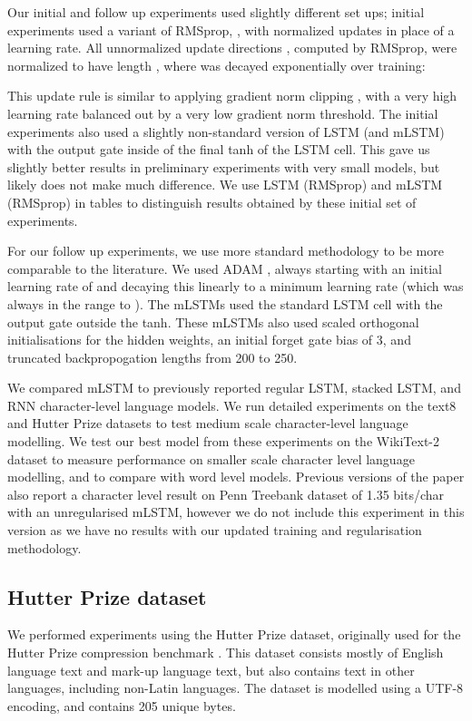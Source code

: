\documentclass{article}
\begin{document}
Our initial and follow up experiments used slightly different set ups; initial experiments used a variant of RMSprop, \citep{tieleman2012}, with normalized updates in place of a learning rate. All unnormalized update directions , computed by RMSprop, were normalized to have length , where  was decayed exponentially over training:


This update rule is similar to applying gradient norm clipping \citep{pascanu2013}, with a very high learning rate balanced out by a very low gradient norm threshold. The initial experiments also used a slightly non-standard version of LSTM (and mLSTM) with the output gate inside of the final tanh of the LSTM cell. This gave us slightly better results in preliminary experiments with very small models, but likely does not make much difference. We use LSTM (RMSprop) and mLSTM (RMSprop) in tables to distinguish results obtained by these initial set of experiments.

For our follow up experiments, we use more standard methodology to be more comparable to the literature. We used ADAM \citep{kingma2014}, always starting with an initial learning rate of  and decaying this linearly to a minimum learning rate (which was always in the range  to ). The mLSTMs used the standard LSTM cell with the output gate outside the tanh. These mLSTMs also used scaled orthogonal initialisations \citep{saxe2013} for the hidden weights, an initial forget gate bias of 3, and truncated backpropogation lengths from 200 to 250.


We compared mLSTM to previously reported regular LSTM, stacked LSTM, and RNN character-level language models. We run detailed experiments on the text8 and Hutter Prize datasets \citep{Hutter2012} to test medium scale character-level language modelling. We test our best model from these experiments on the WikiText-2 dataset \citep{Merity2016} to measure performance on smaller scale character level language modelling, and to compare with word level models. Previous versions of the paper also report a character level result on Penn Treebank dataset \citep{marcus1993} of 1.35 bits/char with an unregularised mLSTM, however we do not include this experiment in this version as we have no results with our updated training and regularisation methodology.


\subsection{Hutter Prize dataset}
We performed experiments using the Hutter Prize dataset, originally used for the Hutter Prize compression benchmark \citep{Hutter2012}. This dataset consists mostly of English language text and mark-up language text, but also contains text in other languages, including non-Latin languages. The dataset is modelled using a UTF-8 encoding, and contains 205 unique bytes. 
\end{document}
